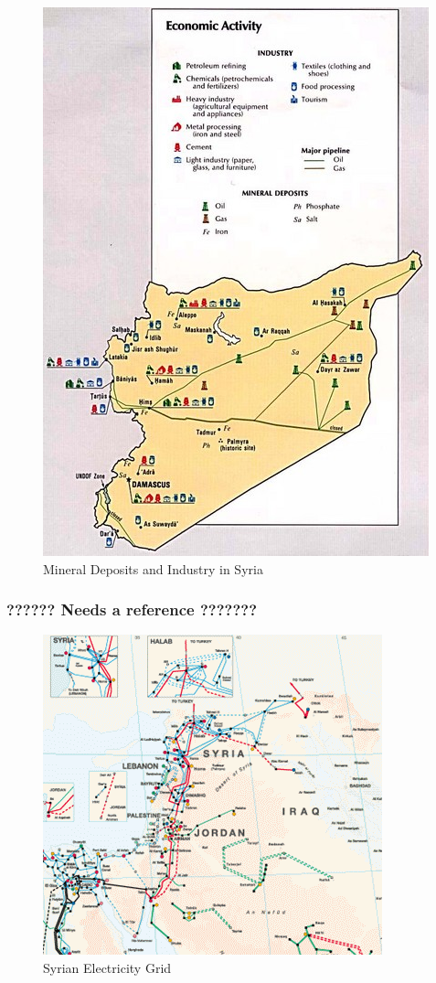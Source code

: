 \documentclass{report}
\begin{document}
\begin{figure}[H]
 \centering
 \includegraphics[trim = 0cm 0cm 0cm 0cm, clip,scale=1]{./figures/syria_minerals.jpg}
   \caption{Mineral Deposits and Industry in Syria}
     \label{fig:syria_minerals}
\end{figure}




\subsubsection{??????  Needs a reference   ???????}

\begin{figure}[H]
 \centering
 \includegraphics[trim = 0cm 0cm 0cm 0cm, clip,scale=1]{./figures/syria_grid.png}
   \caption{Syrian Electricity Grid}
     \label{fig:syria_grid}
\end{figure}
\end{document}
